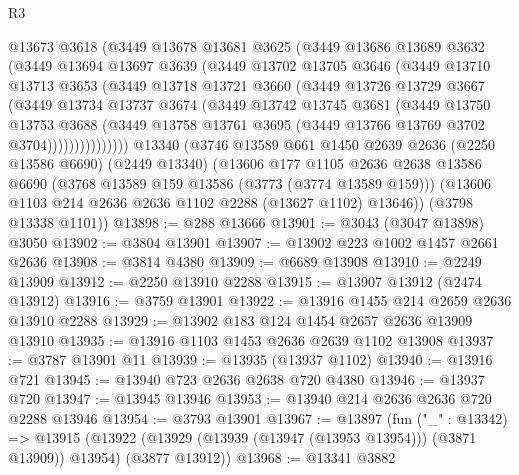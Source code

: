 \begin{lexlean}{R3}
\begin{coremodule}
          @13673
          @3618
          (@3449
            @13678
            @13681
            @3625
            (@3449
              @13686
              @13689
              @3632
              (@3449
                @13694
                @13697
                @3639
                (@3449
                  @13702
                  @13705
                  @3646
                  (@3449
                    @13710
                    @13713
                    @3653
                    (@3449
                      @13718
                      @13721
                      @3660
                      (@3449
                        @13726
                        @13729
                        @3667
                        (@3449
                          @13734
                          @13737
                          @3674
                          (@3449
                            @13742
                            @13745
                            @3681
                            (@3449
                              @13750
                              @13753
                              @3688
                              (@3449
                                @13758
                                @13761
                                @3695
                                (@3449 @13766 @13769 @3702 @3704)))))))))))))))
    @13340
    (@3746
      @13589
      @661
      @1450
      @2639
      @2636
      (@2250 @13586 @6690)
      (@2449 @13340)
      (@13606
        @177
        @1105
        @2636
        @2638
        @13586
        @6690
        (@3768 @13589 @159 @13586 (@3773 (@3774 @13589 @159)))
        (@13606 @1103 @214 @2636 @2636 @1102 @2288 (@13627 @1102) @13646))
      (@3798 @13338 @1101))
@13898 := @288 @13666
@13901 := @3043 (@3047 @13898) @3050
@13902 := @3804 @13901
@13907 := @13902 @223 @1002 @1457 @2661 @2636
@13908 := @3814 @4380
@13909 := @6689 @13908
@13910 := @2249 @13909
@13912 := @2250 @13910 @2288
@13915 := @13907 @13912 (@2474 @13912)
@13916 := @3759 @13901
@13922 := @13916 @1455 @214 @2659 @2636 @13910 @2288
@13929 := @13902 @183 @124 @1454 @2657 @2636 @13909 @13910
@13935 := @13916 @1103 @1453 @2636 @2639 @1102 @13908
@13937 := @3787 @13901 @11
@13939 := @13935 (@13937 @1102)
@13940 := @13916 @721
@13945 := @13940 @723 @2636 @2638 @720 @4380
@13946 := @13937 @720
@13947 := @13945 @13946
@13953 := @13940 @214 @2636 @2636 @720 @2288 @13946
@13954 := @3793 @13901
@13967 := @13897
    (fun ("_" : @13342) =>
    @13915 (@13922 (@13929 (@13939 (@13947 (@13953 @13954))) (@3871 @13909)) @13954) (@3877 @13912))
@13968 := @13341 @3882

\end{coremodule}
\end{lexlean}
